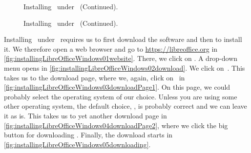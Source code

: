 %
%
\begin{figure}%
\ContinuedFloat%
\centering%
%
%
%
\floatRowSep%
%
%
%
\floatRowSep%
%
%
%
\caption{Installing \libreoffice\ under \microsoftWindows~(Continued).}%
\label{fig:installingLibreOfficeWindowsG}%
\end{figure}%
%
%
\begin{figure}%
\ContinuedFloat%
\centering%
%
%
%
\caption{Installing \libreoffice\ under \microsoftWindows~(Continued).}%
\label{fig:installingLibreOfficeWindowsH}%
\end{figure}%
%
%
Installing \libreoffice\ under \microsoftWindows\ requires us to first download the software and then to install it.
We therefore open a web browser and go to \url{https://libreoffice.org} in \cref{fig:installingLibreOfficeWindows01website}.
There, we click on .
A drop-down menu opens in \cref{fig:installingLibreOfficeWindows02download}.
We click on~.
This takes us to the download page, where we, again, click on~ in \cref{fig:installingLibreOfficeWindows03downloadPage1}.
On this page, we could probably select the operating system of our choice.
Unless you are using some other operating system, the default choice, , is probably correct and we can leave it as is.
This takes us to yet another download page in \cref{fig:installingLibreOfficeWindows04downloadPage2}, where we click the big button for downloading \libreoffice.
Finally, the download starts in \cref{fig:installingLibreOfficeWindows05downloading}.


